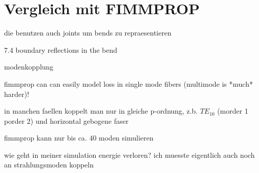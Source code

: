 \documentclass{article}
\begin{document}
\section{Vergleich mit FIMMPROP}
die benutzen auch joints um bends zu repraesentieren

7.4 boundary reflections in the bend

modenkopplung

fimmprop can can easily model loss in single mode fibers (multimode is
*much* harder)!

in manchen faellen koppelt man nur in gleiche p-ordnung, z.b. $TE_{10}$
(morder 1 porder 2) und horizontal gebogene faser

fimmprop kann nur bis ca. 40 moden simulieren

wie geht in meiner simulation energie verloren? ich muesste eigentlich auch noch an strahlungsmoden koppeln
\end{document}
